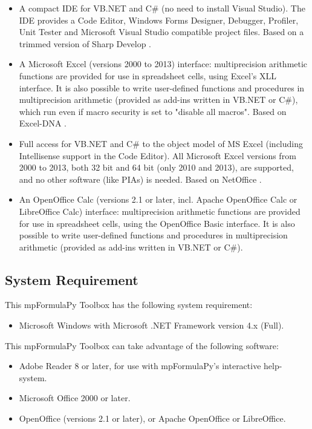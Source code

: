 \begin{itemize}		
\item A compact IDE for VB.NET and C\# (no need to install Visual Studio). The IDE provides a Code Editor, Windows Forms Designer, Debugger, Profiler, Unit Tester and Microsoft Visual Studio compatible project files. Based on a trimmed version of Sharp Develop  \citep{SharpDevelop2013}.
\item A Microsoft Excel (versions 2000 to 2013) interface: multiprecision arithmetic functions are provided for use in spreadsheet cells, using Excel's XLL interface. It is also possible to write user-defined functions and procedures in multiprecision arithmetic (provided as add-ins written in VB.NET or C\#), which run even if macro security is set to "disable all macros". Based on Excel-DNA \citep{vanDrimmelen2013}.	
\item Full access for VB.NET and C\# to the object model of MS Excel (including Intellisense support in the Code Editor). All Microsoft Excel versions from 2000 to 2013,  both 32 bit and 64 bit (only 2010 and 2013), are supported, and no other software (like PIAs) is needed. Based on NetOffice \citep{Lange2013}.
\item An OpenOffice Calc (versions 2.1 or later, incl. Apache OpenOffice Calc or LibreOffice Calc) interface: multiprecision arithmetic functions are provided for use in spreadsheet cells, using the OpenOffice Basic interface. It is also possible to write user-defined functions and procedures in multiprecision arithmetic (provided as add-ins written in VB.NET or C\#).	
\end{itemize}




\subsection{System Requirement}
\label{System Requirements}
This mpFormulaPy Toolbox has the following system requirement:

\begin{itemize}
  \item Microsoft Windows with Microsoft .NET Framework version 4.x (Full).
\end{itemize}


This mpFormulaPy Toolbox can take advantage of the following software:

\begin{itemize}
  \item Adobe Reader 8 or later, for use with mpFormulaPy's interactive help-system.
  \item Microsoft Office 2000 or later.
  \item OpenOffice (versions 2.1 or later), or Apache OpenOffice or LibreOffice.
\end{itemize}


